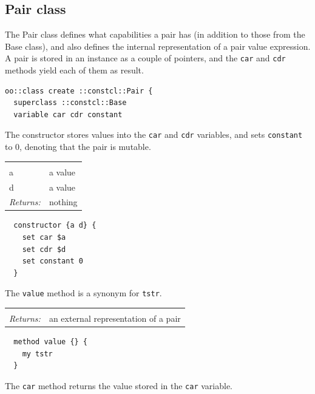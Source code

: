 \documentclass[a5paper,draft]{memoir}
\begin{document}
\subsection{Pair class}
\label{pair-class}

The Pair class defines what capabilities a pair has (in addition to those from the Base class), and also defines the internal representation of a pair value expression. A pair is stored in an instance as a couple of pointers, and the \texttt{car} and \texttt{cdr} methods yield each of them as result.

\begin{lstlisting}
oo::class create ::constcl::Pair {
  superclass ::constcl::Base
  variable car cdr constant
\end{lstlisting}

The constructor stores values into the \texttt{car} and \texttt{cdr} variables, and sets \texttt{constant} to 0, denoting that the pair is mutable.

\noindent\begin{tabular}{ |p{1.9cm} p{6.5cm}| }
\hline
\rowcolor[HTML]{CCCCCC} \multicolumn{2}{|l|}{\textbf{Pair constructor (internal)}} \\
a & a value \\
d & a value \\
\textit{Returns:} & nothing \\
\hline
\end{tabular}

\begin{lstlisting}
  constructor {a d} {
    set car $a
    set cdr $d
    set constant 0
  }
\end{lstlisting}

The \texttt{value} method is a synonym for \texttt{tstr}.

\noindent\begin{tabular}{ |p{1.9cm} p{6.5cm}| }
\hline
\rowcolor[HTML]{CCCCCC} \multicolumn{2}{|l|}{\textbf{(Pair instance) value (internal)}} \\
\textit{Returns:} & an external representation of a pair \\
\hline
\end{tabular}

\begin{lstlisting}
  method value {} {
    my tstr
  }
\end{lstlisting}

The \texttt{car} method returns the value stored in the \texttt{car} variable.
\end{document}
